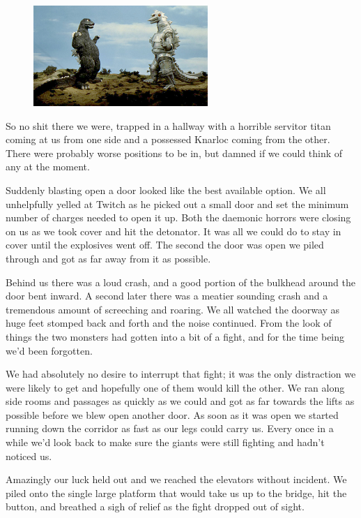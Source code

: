 \begin{figure}
	\begin{center}
		\includegraphics[width=\figwidth]{pics/7/44.png}
	\end{center}
\end{figure}
So no shit there we were, trapped in a hallway with a horrible servitor titan coming at us from one side and a possessed Knarloc coming from the other. 
There were probably worse positions to be in, but damned if we could think of any at the moment. 


Suddenly blasting open a door looked like the best available option. 
We all unhelpfully yelled at Twitch as he picked out a small door and set the minimum number of charges needed to open it up. 
Both the daemonic horrors were closing on us as we took cover and hit the detonator. 
It was all we could do to stay in cover until the explosives went off. 
The second the door was open we piled through and got as far away from it as possible.

Behind us there was a loud crash, and a good portion of the bulkhead around the door bent inward. 
A second later there was a meatier sounding crash and a tremendous amount of screeching and roaring. 
We all watched the doorway as huge feet stomped back and forth and the noise continued. 
From the look of things the two monsters had gotten into a bit of a fight, and for the time being we’d been forgotten. 


We had absolutely no desire to interrupt that fight; 
it was the only distraction we were likely to get and hopefully one of them would kill the other. 
We ran along side rooms and passages as quickly as we could and got as far towards the lifts as possible before we blew open another door. 
As soon as it was open we started running down the corridor as fast as our legs could carry us. 
Every once in a while we’d look back to make sure the giants were still fighting and hadn’t noticed us.

Amazingly our luck held out and we reached the elevators without incident. 
We piled onto the single large platform that would take us up to the bridge, hit the button, and breathed a sigh of relief as the fight dropped out of sight.

